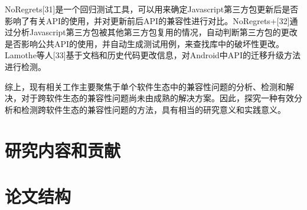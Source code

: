 NoRegrets[31]是一个回归测试工具，可以用来确定Javascript第三方包更新后是否影响了有关API的使用，并对更新前后API的兼容性进行对比。NoRegrets+[32]通过分析Javascript第三方包被其他第三方包复用的情况，自动判断第三方包的更改是否影响公共API的使用，并自动生成测试用例，来查找库中的破坏性更改。Lamothe等人[33]基于文档和历史代码更改信息，对Android中API的迁移升级方法进行检测。

综上，现有相关工作主要聚焦于单个软件生态中的兼容性问题的分析、检测和解决，对于跨软件生态的兼容性问题尚未由成熟的解决方案。因此，探究一种有效分析和检测跨软件生态的兼容性问题的方法，具有相当的研究意义和实践意义。


\section{研究内容和贡献}
\section{论文结构}


